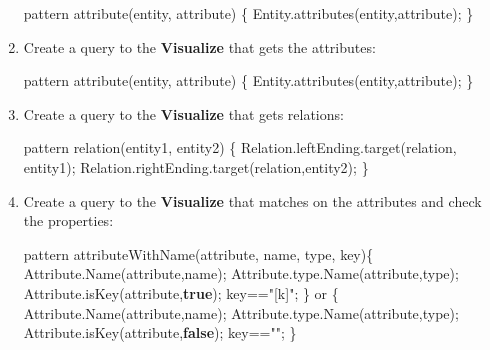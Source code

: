 \documentclass[]{report}
\newenvironment{Shaded}{}{}
\newcommand{\KeywordTok}[1]{\textcolor[rgb]{0.00,0.44,0.13}{\textbf{{#1}}}}
\newcommand{\StringTok}[1]{\textcolor[rgb]{0.25,0.44,0.63}{{#1}}}
\newcommand{\FunctionTok}[1]{\textcolor[rgb]{0.02,0.16,0.49}{{#1}}}
\newcommand{\NormalTok}[1]{{#1}}
\begin{document}
\begin{enumerate}
\begin{Shaded}
\begin{Highlighting}[]
\NormalTok{pattern }\FunctionTok{attribute}\NormalTok{(entity, attribute) \{}
    \NormalTok{Entity.}\FunctionTok{attributes}\NormalTok{(entity,attribute);}
\NormalTok{\}}
\end{Highlighting}
\end{Shaded}
\item
  Create a query to the \textbf{Visualize} that gets the attributes:

\begin{Shaded}
\begin{Highlighting}[]
\NormalTok{pattern }\FunctionTok{attribute}\NormalTok{(entity, attribute) \{}
    \NormalTok{Entity.}\FunctionTok{attributes}\NormalTok{(entity,attribute);}
\NormalTok{\}}
\end{Highlighting}
\end{Shaded}
\item
  Create a query to the \textbf{Visualize} that gets relations:

\begin{Shaded}
\begin{Highlighting}[]
\NormalTok{pattern }\FunctionTok{relation}\NormalTok{(entity1, entity2) \{}
    \NormalTok{Relation.}\FunctionTok{leftEnding}\NormalTok{.}\FunctionTok{target}\NormalTok{(relation, entity1);}
    \NormalTok{Relation.}\FunctionTok{rightEnding}\NormalTok{.}\FunctionTok{target}\NormalTok{(relation,entity2);}
\NormalTok{\}}
\end{Highlighting}
\end{Shaded}
\item
  Create a query to the \textbf{Visualize} that matches on the
  attributes and check the properties:

\begin{Shaded}
\begin{Highlighting}[]
\NormalTok{pattern }\FunctionTok{attributeWithName}\NormalTok{(attribute, name, type, key)\{}
    \NormalTok{Attribute.}\FunctionTok{Name}\NormalTok{(attribute,name);}
    \NormalTok{Attribute.}\FunctionTok{type}\NormalTok{.}\FunctionTok{Name}\NormalTok{(attribute,type);}
    \NormalTok{Attribute.}\FunctionTok{isKey}\NormalTok{(attribute,}\KeywordTok{true}\NormalTok{);}
    \NormalTok{key==}\StringTok{"[k]"}\NormalTok{;}
\NormalTok{\} or \{}
    \NormalTok{Attribute.}\FunctionTok{Name}\NormalTok{(attribute,name);}
    \NormalTok{Attribute.}\FunctionTok{type}\NormalTok{.}\FunctionTok{Name}\NormalTok{(attribute,type);}
    \NormalTok{Attribute.}\FunctionTok{isKey}\NormalTok{(attribute,}\KeywordTok{false}\NormalTok{);}
    \NormalTok{key==}\StringTok{""}\NormalTok{;}
\NormalTok{\}}
\end{Highlighting}
\end{Shaded}
\end{enumerate}
\end{document}
